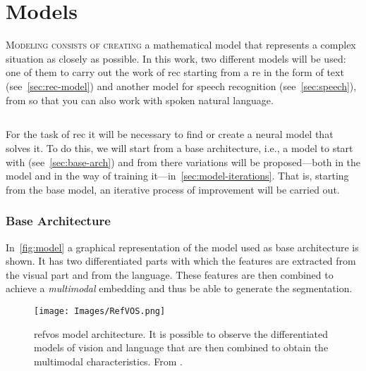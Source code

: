 

\chapter{Models}\label{cha:models}



\lettrine{M}{odeling consists of creating} a mathematical model that represents
a complex situation as closely as possible. In this work, two different models
will be used: one of them to carry out the work of \gls{rec} starting from a
\gls{re} in the form of text (see\ \vref{sec:rec-model}) and another model for
speech recognition (see\ \vref{sec:speech}), from so that you can also work with
spoken natural language.



\section{}\label{sec:rec-model}

For the task of \gls{rec} it will be necessary to find or create a neural model
that solves it. To do this, we will start from a base architecture, i.e., a
model to start with (see\ \vref{sec:base-arch}) and from there variations will
be proposed---both in the model and in the way of training it---in\
\vref{sec:model-iterations}. That is, starting from the base model, an
iterative process of improvement will be carried out.


\subsection{Base Architecture}\label{sec:base-arch}

In\ \vref{fig:model} a graphical representation of the model used as base
architecture is shown. It has two differentiated parts with which the features
are extracted from the visual part and from the language. These features are
then combined to achieve a \emph{multimodal} embedding and thus be able to
generate the segmentation.

\begin{figure}[ht]
  \centering
  \texttt{[image: Images/RefVOS.png]}
  \caption[ model architecture]{\gls{refvos} model
    architecture. It is possible to observe the differentiated models of vision
    and language that are then combined to obtain the multimodal
    characteristics. From \figcite{bellver20:refvos}.}%
  \label{fig:model}
\end{figure}

